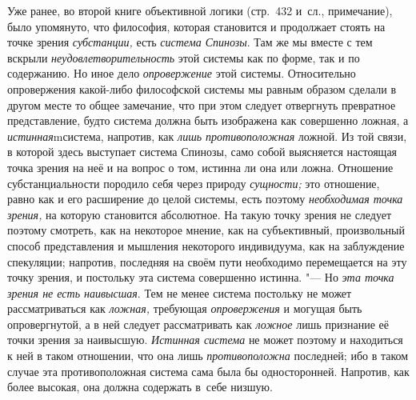 Уже ранее, во второй книге объективной логики (стр.~432 и~сл., примечание),
было упомянуто, что философия, которая становится и продолжает стоять на
точке зрения {\em субстанции,} есть {\em система Спинозы}. Там же мы вместе
с тем вскрыли {\em неудовлетворительность} этой системы как по форме, так и
по содержанию. Но иное дело {\em опровержение} этой системы. Относительно
опровержения какой-либо философской системы мы равным образом сделали в
другом месте то общее замечание, что при этом следует отвергнуть превратное
представление, будто система должна быть изображена как совершенно ложная,
а {\em истинная}mсистема, напротив, как {\em лишь противоположная} ложной.
Из той связи, в которой здесь выступает система Спинозы, само собой
выясняется настоящая точка зрения на неё и на вопрос о том, истинна ли она
или ложна. Отношение субстанциальности породило себя через природу
{\em сущности;} это отношение, равно как и его расширение до целой системы,
есть поэтому {\em необходимая точка зрения,} на которую становится
абсолютное. На такую точку зрения не следует поэтому смотреть, как на
некоторое мнение, как на субъективный, произвольный способ представления и
мышления некоторого индивидуума, как на заблуждение спекуляции; напротив,
последняя на своём пути необходимо перемещается на эту точку зрения, и
постольку эта система совершенно истинна. "--- Но {\em эта точка зрения не есть
наивысшая}. Тем не менее система постольку не может рассматриваться как
{\em ложная,} требующая {\em опровержения} и могущая быть опровергнутой, а в
ней следует рассматривать как {\em ложное} лишь признание её точки зрения за
наивысшую. {\em Истинная система} не может поэтому и находиться к ней в
таком отношении, что она лишь {\em противоположна} последней; ибо в таком
случае эта противоположная система сама была бы односторонней. Напротив, как
более высокая, она должна содержать в~себе низшую.

